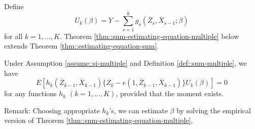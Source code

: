 Define 
$$
U_k(\beta) = Y - \sum_{s=1}^k  g_s( \overline{Z}_s, \overline{X}_{s-1}; \beta) 
$$
for all $k=1,\ldots, K$. Theorem  \ref{thm::snm-estimating-equation-multiple} below extends Theorem \ref{thm::estimating-equation-snm}.



\begin{theorem}
\label{thm::snm-estimating-equation-multiple}
Under Assumption \ref{assume::si-multiple} and Definition \ref{def::snm-multiple},  we have 
$$
E\left[    h_k( \overline{Z}_{k-1}, \overline{X}_{k-1} ) \{  Z_k - e(1, \overline{Z}_{k-1}, \overline{X}_{k-1}) \}  U_k(\beta) 
\right] = 0
$$
for any functions $h_k$ $(k=1,\ldots, K)$, provided that   the moment exists. 
\end{theorem}



Remark: Choosing appropriate $h_k$'s, we can estimate $\beta$ by solving the empirical version of Theorem \ref{thm::snm-estimating-equation-multiple}. 


  
    
